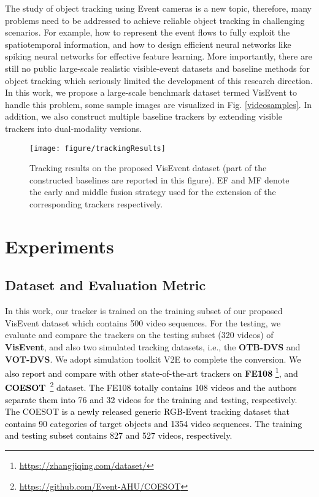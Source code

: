 \documentclass[journal]{IEEEtran}
\begin{document}
The study of object tracking using Event cameras is a new topic, therefore, many problems need to be addressed to achieve reliable object tracking in challenging scenarios. For example, how to represent the event flows to fully exploit the spatiotemporal information, and how to design efficient neural networks like spiking neural networks for effective feature learning. More importantly, there are still no public large-scale realistic visible-event datasets and baseline methods for object tracking which seriously limited the development of this research direction. In this work, we propose a large-scale benchmark dataset termed VisEvent to handle this problem, some sample images are visualized in Fig. \ref{videosamples}. In addition, we also construct multiple baseline trackers by extending visible trackers into dual-modality versions. 




 

\begin{figure*}[!htp]
\center
\texttt{[image: figure/trackingResults]}
\caption{Tracking results on the proposed VisEvent dataset (part of the constructed baselines are reported in this figure). EF and MF denote the early and middle fusion strategy used for the extension of the corresponding trackers respectively.}    
\label{benchmarkResults}
\end{figure*} 	







\section{Experiments} \label{experiments}

\subsection{Dataset and Evaluation Metric}    
In this work, our tracker is trained on the training subset of our proposed VisEvent dataset which contains 500 video sequences. For the testing, we evaluate and compare the trackers on the testing subset (320 videos) of  \textbf{VisEvent}, and also two simulated tracking datasets, i.e., the \textbf{OTB-DVS} and \textbf{VOT-DVS}. We adopt simulation toolkit V2E \cite{delbruck2020v2e} to complete the conversion. 
\textcolor{black}{
We also report and compare with other state-of-the-art trackers on \textbf{FE108} \footnote{\url{https://zhangjiqing.com/dataset/}}, 
and \textbf{COESOT}~\cite{tang2022coesot}\footnote{\url{https://github.com/Event-AHU/COESOT}} dataset. 
The FE108 totally contains 108 videos and the authors separate them into 76 and 32 videos for the training and testing, respectively. 
The COESOT is a newly released generic RGB-Event tracking dataset that contains 90 categories of target objects and 1354 video sequences. The training and testing subset contains 827 and 527 videos, respectively. 
}
\end{document}
